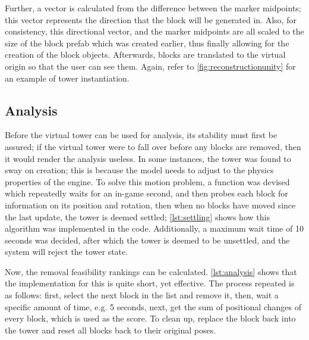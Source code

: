 

Further, a vector is calculated from the difference between the marker midpoints; this vector represents the direction that the block will be generated in. Also, for consistency, this directional vector, and the marker midpoints are all scaled to the size of the block prefab which was created earlier, thus finally allowing for the creation of the block objects. Afterwards, blocks are translated to the virtual origin so that the user can see them. Again, refer to \cref{fig:reconstructionunity} for an example of tower instantiation.

\subsection{Analysis}

Before the virtual tower can be used for analysis, its stability must first be assured; if the virtual tower were to fall over before any blocks are removed, then it would render the analysis useless. In some instances, the tower was found to sway on creation; this is because the model needs to adjust to the physics properties of the engine. To solve this motion problem, a function was devised which repeatedly waits for an in-game second, and then probes each block for information on its position and rotation, then when no blocks have moved since the last update, the tower is deemed settled;  \cref{lst:settling} shows how this algorithm was implemented in the code. Additionally, a maximum wait time of 10 seconds was decided, after which the tower is deemed to be unsettled, and the system will reject the tower state.



Now, the removal feasibility rankings can be calculated. \cref{lst:analysis} shows that the implementation for this is quite short, yet effective. The process repeated is as follows: first, select the next block in the list and remove it, then, wait a specific amount of time, e.g. 5 seconds, next, get the sum of positional changes of every block, which is used as the score. To clean up, replace the block back into the tower and reset all blocks back to their original poses.

